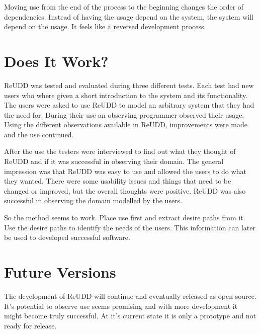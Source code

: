 \documentclass[a4paper]{article}
\begin{document}
\begin{multicols}{2}
Moving use from the end of the process to the beginning changes the order of dependencies. Instead of having the usage depend on the system, the system will depend on the usage. It feels like a reversed development process.

\section*{Does It Work?}
ReUDD was tested and evaluated during three different tests. Each test had new users who where given a short introduction to the system and its functionality. The users were asked to use ReUDD to model an arbitrary system that they had the need for. During their use an observing programmer observed their usage. Using the different observations available in ReUDD, improvements were made and the use continued.

After the use the testers were interviewed to find out what they thought of ReUDD and if it was successful in observing their domain. The general impression was that ReUDD was easy to use and allowed the users to do what they wanted. There were some usability issues and things that need to be changed or improved, but the overall thoughts were positive. ReUDD was also successful in observing the domain modelled by the users.

So the method seems to work. Place use first and extract desire paths from it. Use the desire paths to identify the needs of the users. This information can later be used to developed successful software.

\section*{Future Versions}
The development of ReUDD will continue and eventually released as open source. It's potential to observe use seems promising and with more development it might become truly successful. At it's current state it is only a prototype and not ready for release.
	
\end{multicols}
\end{document}
